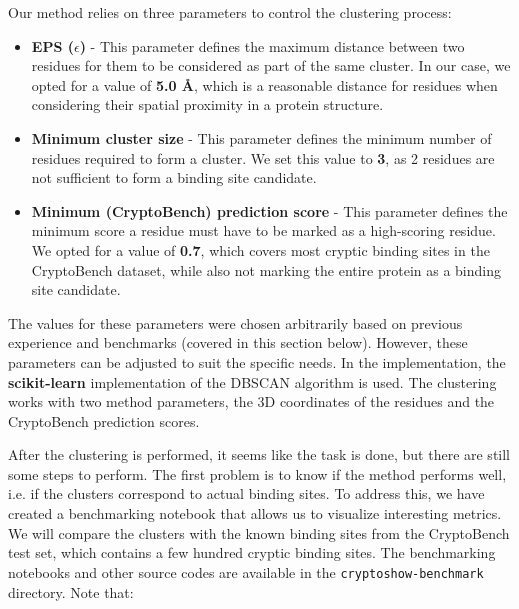 Our method relies on three parameters to control the clustering process:
\begin{itemize}
    \item \textbf{EPS ($\epsilon$)} - This parameter defines the maximum distance between two residues for them to be considered as part of the same cluster. In our case, we opted for a value of \textbf{5.0 \AA}, which is a reasonable distance for residues when considering their spatial proximity in a protein structure.
    \item \textbf{Minimum cluster size} - This parameter defines the minimum number of residues required to form a cluster. We set this value to \textbf{3}, as 2 residues are not sufficient to form a binding site candidate.
    \item \textbf{Minimum (CryptoBench) prediction score} - This parameter defines the minimum score a residue must have to be marked as a high-scoring residue. We opted for a value of \textbf{0.7}, which covers most cryptic binding sites in the CryptoBench dataset, while also not marking the entire protein as a binding site candidate.
\end{itemize}

The values for these parameters were chosen arbitrarily based on previous experience and benchmarks (covered in this section below). However, these parameters can be adjusted to suit the specific needs. In the implementation, the \textbf{scikit-learn} \cite{kramer2016scikit} implementation of the DBSCAN algorithm is used. The clustering works with two method parameters, the 3D coordinates of the residues and the CryptoBench prediction scores.

After the clustering is performed, it seems like the task is done, but there are still some steps to perform. The first problem is to know if the method performs well, i.e. if the clusters correspond to actual binding sites. To address this, we have created a benchmarking notebook that allows us to visualize interesting metrics. We will compare the clusters with the known binding sites from the CryptoBench test set, which contains a few hundred cryptic binding sites. The benchmarking notebooks and other source codes are available in the \lstinline!cryptoshow-benchmark! directory. Note that:

